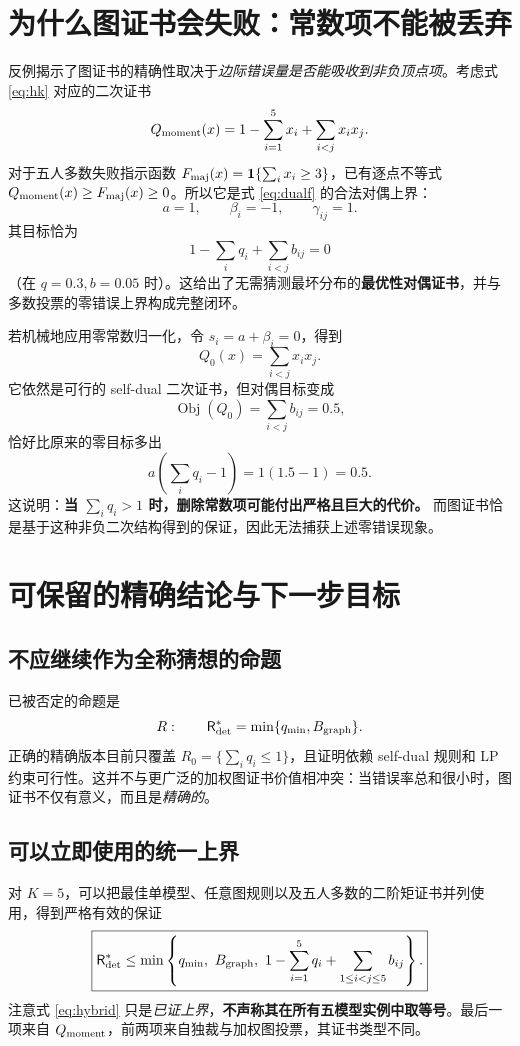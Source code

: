\documentclass[11pt,a4paper]{ctexart}
\theoremstyle{definition}
\newcommand{\Risk}{\mathsf R}
\newcommand{\I}{\mathbf 1}
\begin{document}
\section{为什么图证书会失败：常数项不能被丢弃}
反例揭示了图证书的精确性取决于\emph{边际错误量是否能吸收到非负顶点项}。考虑式 \eqref{eq:hk} 对应的二次证书
\begin{equation}\label{eq:Qmoment}
Q_{\rm moment}(x)=1-\sum_{i=1}^5x_i+\sum_{i<j}x_ix_j.
\end{equation}
对于五人多数失败指示函数 $F_{\rm maj}(x)=\I\{\sum_i x_i\ge3\}$，已有逐点不等式 $Q_{\rm moment}(x)\ge F_{\rm maj}(x)\ge0$。所以它是式 \eqref{eq:dualf} 的合法对偶上界：
\[
a=1,\qquad \beta_i=-1,\qquad\gamma_{ij}=1.
\]
其目标恰为
\begin{equation}\label{eq:objective0}
1-\sum_iq_i+\sum_{i<j}b_{ij}=0
\end{equation}
（在 $q=0.3,b=0.05$ 时）。这给出了无需猜测最坏分布的\textbf{最优性对偶证书}，并与多数投票的零错误上界构成完整闭环。

若机械地应用零常数归一化，令 $s_i=a+\beta_i=0$，得到
\[
Q_0(x)=\sum_{i<j}x_ix_j.
\]
它依然是可行的 self-dual 二次证书，但对偶目标变成
\[
\operatorname{Obj}(Q_0)=\sum_{i<j}b_{ij}=0.5,
\]
恰好比原来的零目标多出
\[
a\left(\sum_iq_i-1\right)=1(1.5-1)=0.5.
\]
这说明：\textbf{当 $\sum_iq_i>1$ 时，删除常数项可能付出严格且巨大的代价。} 而图证书恰是基于这种非负二次结构得到的保证，因此无法捕获上述零错误现象。

\section{可保留的精确结论与下一步目标}
\subsection{不应继续作为全称猜想的命题}
已被否定的命题是
\[
R:\qquad \Risk^*_{\rm det}=\min\{q_{\min},B_{\rm graph}\}.
\]
正确的精确版本目前只覆盖 $R_0=\{\sum_iq_i\le1\}$，且证明依赖 self-dual 规则和 LP 约束可行性。这并不与更广泛的加权图证书价值相冲突：当错误率总和很小时，图证书不仅有意义，而且是\emph{精确的}。

\subsection{可以立即使用的统一上界}
对 $K=5$，可以把最佳单模型、任意图规则以及五人多数的二阶矩证书并列使用，得到严格有效的保证
\begin{equation}\label{eq:hybrid}
\boxed{
\Risk^*_{\rm det}\le
\min\left\{q_{\min},\ B_{\rm graph},\ 1-\sum_{i=1}^5q_i+\sum_{1\le i<j\le5}b_{ij}\right\}.
}
\end{equation}
注意式 \eqref{eq:hybrid} 只是\emph{已证上界}，\textbf{不声称其在所有五模型实例中取等号}。最后一项来自 $Q_{\rm moment}$，前两项来自独裁与加权图投票，其证书类型不同。
\end{document}
